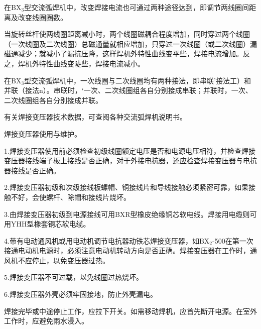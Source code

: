 \documentclass{ctexbook}
\begin{document}
在BX$_3$型交流弧焊机中，改变焊接电流也可通过两种途径达到，即调节两线圈间距离及改变线圈圈数。

当旋转丝杆使两线圈距离减小时，两个线圈磁耦合程度增加，同时穿过两个线圈（一次线圈及二次线圈）总磁通量就相应增加，只穿过一次线圈（或二次线圈）漏磁通减少；就减小了漏抗压降，这样焊机外特性曲线变平些，焊接电流增加。反之，焊机外特性曲线变陡些，焊接电流减小。

在BX$_3$型交流弧焊机中，一次线圈与二次线圈均有两种接法，即串联'接法工）和并联（接法n）。串联时，‘一次、二次线圈组各自分别接成串联；并联时，一次、二次线圈组各自分别接成并联。

有关焊接变压器技术数据，可查阅各种交流弧焊机说明书。

焊接变压器使用与维护。

1.焊接变压器使用前必须检查初级线圈额定电压是否和电源电压相符，并检查焊接变压器接线端子板上接线是否正确，对于外接电抗器，还应检查焊接变压器与电抗器接线是否正确。

2.焊接变压器初级和次级接线板螺帽、铜接线片和导线接触必须紧密可靠，如果接触不好，会使螺杆、除帽和接线片烧坏。

3.由焊接变压器初级到电源接线可用BXR型橡皮绝缘铜芯软电线。焊接用电缆则可用YHH型橡套铜芯软电缆。

4.带有电动通风机或用电动机调节电抗器动铁芯焊接变压器，如BX$_2$-500在第一次接通电动机电源时，必须注意电动机转动方向是否正确。焊接变压器在工作时，通风机不应停止，以免变压器过热。

5.焊接变压器不可过载，以免线圈过热烧坏。

6.焊接变压器外壳必须牢固接地，防止外壳漏电。

焊接完毕或中途停止工作，应拉下开关。如需移动焊机，应首先断开电源。在室外工作时，应避免雨水浸入。
\end{document}
